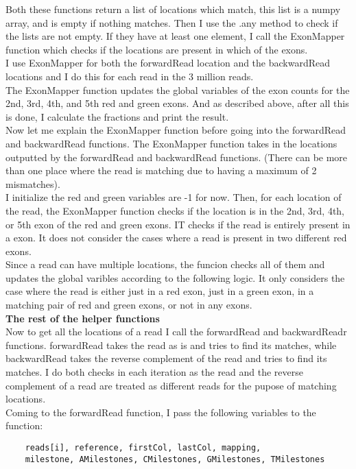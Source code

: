 \documentclass[12pt]{article}
\begin{document}
Both these functions return a list of locations which match, this list is a numpy array, and is empty if nothing matches.
Then I use the .any method to check if the lists are not empty. If they have at least one element, I call the ExonMapper function which checks if the locations are present in which of the exons.\\
I use ExonMapper for both the forwardRead location and the backwardRead locations and I do this for each read in the 3 million reads.\\
The ExonMapper function updates the global variables of the exon counts for the 2nd, 3rd, 4th, and 5th red and green exons. And as described above, after all this is done, I calculate the fractions and print the result.\\
Now let me explain the ExonMapper function before going into the forwardRead and backwardRead functions. The ExonMapper function takes in the locations outputted by the forwardRead and backwardRead functions. (There can be more than one place where the read is matching due to having a maximum of 2 mismatches).\\
I initialize the red and green variables are -1 for now. Then, for each location of the read, the ExonMapper function checks if the location is in the 2nd, 3rd, 4th, or 5th exon of the red and green exons. IT checks if the read is entirely present in a exon. It does not consider the cases where a read is present in two different red exons.\\
Since a read can have multiple locations, the funcion checks all of them and updates the global varibles according to the following logic. It only considers the case where the read is either just in a red exon, just in a green exon, in a matching pair of red and green exons, or not in any exons.\\
\textbf{The rest of the helper functions}\\
Now to get all the locations of a read I call the forwardRead and backwardReadr functions. forwardRead takes the read as is and tries to find its matches, while backwardRead takes the reverse complement of the read and tries to find its matches. I do both checks in each iteration as the read and the reverse complement of a read are treated as different reads for the pupose of matching locations.\\
Coming to the forwardRead function, I pass the following variables to the function:
\begin{verbatim}
    reads[i], reference, firstCol, lastCol, mapping,
    milestone, AMilestones, CMilestones, GMilestones, TMilestones
\end{verbatim}
\end{document}
